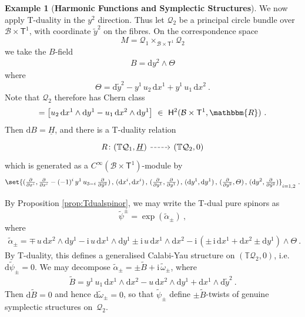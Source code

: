 \documentclass[a4paper, reqno, 11pt]{amsart}
\numberwithin{equation}{section}
\theoremstyle{definition}
\newtheorem{example}[equation]{Example}
\newcommand{\red}[1]{\underline{#1}}
\newcommand{\de}{\mathrm{d}}
\newcommand{\ii}{\mathrm{i}}
\newcommand{\IR}{\mathbbm{R}}
\newcommand{\IT}{\mathbb{T}}
\newcommand{\cB}{{\mathcal B}}
\newcommand{\cQ}{{\mathcal Q}}
\newcommand{\sfT}{{\mathsf{T}}}
\newcommand{\sfH}{{\mathsf{H}}}
\theoremstyle{remark}
\begin{document}
\begin{example}[\textbf{Harmonic Functions and Symplectic Structures}]
    We now apply T-duality in the $y^2$ direction. Thus let $\cQ_2$ be a principal circle bundle over $\cB\times \sfT^1$, with coordinate $\tilde y^2$ on the fibres. On the correspondence space $$M = \cQ_1 \times_{\cB \times \sfT^1} \cQ_2$$ we take the $B$-field
    \begin{align}
        B = \de y^2 \wedge \varTheta
    \end{align}
    where $$\varTheta = \de \tilde y^2 - y^1\, u_2\, \de x^1 + y^1\, u_1\, \de x^2 \ . $$ Note that $\cQ_2$ therefore has Chern class
    \begin{align}
        [\de\varTheta] = \big[u_2\,\de x^1 \wedge \de y^1 - u_1\, \de x^2 \wedge \de y^1\big] \ \in \ \sfH^2(\cB\times\sfT^1 ,\IR) \ .
    \end{align}
    Then $\de B = \red H$, and there is a T-duality relation 
    \begin{equation}
\begin{tikzcd}
 R  \colon (\IT \cQ_1, \red H) \ar[r,dashed] & (\IT \cQ_2,0)
 \end{tikzcd}
\end{equation} 
which is generated as a $C^\infty(\cB\times\sfT^1)$-module by
    \begin{align}
        \set{(\tfrac\partial{\partial x^i}, \tfrac\partial{\partial x^i} - (-1)^i\,y^1\, u_{3-i}\, \tfrac\partial{\partial \tilde y^2})\,,\,(\de x^i, \de x^i)\,,\,(\tfrac\partial{\partial y^1}, \tfrac\partial{\partial y^1})\,,\, (\de y^1, \de y^1)\,,\, (\tfrac\partial{\partial y^2}, \varTheta)\,,\, (\de y^2, \tfrac\partial{\partial \tilde y^2})}_{i=1,2} \ .
    \end{align}
    
    By Proposition \ref{prop:Tdualspinor}, we may write the T-dual pure spinors as $$\tilde \psi^\pm = \exp(\tilde \alpha_\pm) \ , $$ where 
    \begin{align}
        \tilde \alpha_\pm = \mp\, u\, \de x^2 \wedge \de y^1 - \ii\,u\,\de x^1 \wedge \de y^1 \pm \ii\,u \, \de x^1 \wedge \de x^2 -\ii\,(\pm\, \ii\,\de x^1 + \de x^2 \pm \de y^1)\wedge \varTheta \ .
    \end{align}
    By T-duality, this defines a generalised Calabi-Yau structure on $(\IT\cQ_2,0)$, i.e. $\de \tilde \psi_\pm =0$.
    We may decompose $\tilde \alpha_\pm = \pm \tilde B + \ii\, \tilde\omega_\pm$, where
    \begin{align}
        \tilde B = y^1\, u_1\,\de x^1 \wedge \de x^2 - u\, \de x^2 \wedge \de y^1 + \de x^1 \wedge \de \tilde y^2 \ .
    \end{align}
    Then $\de \tilde B = 0$ and hence $\de \tilde \omega_\pm=0$, so that $\tilde \psi_\pm$  define $\pm\tilde B$-twists of genuine symplectic structures on~$\cQ_2$.
\end{example}
\end{document}
